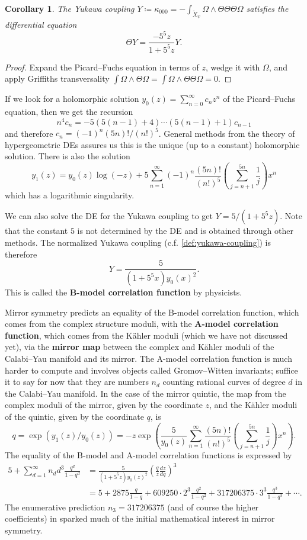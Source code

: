 \documentclass{report}
\theoremstyle{plain}
\newtheorem{corollary}[theorem]{Corollary}
\theoremstyle{definition}
\theoremstyle{remark}
\begin{document}
\begin{corollary}
  The Yukawa coupling $Y \coloneqq \kappa_{000} =
  -\int_{\tilde{X}_\psi} \Omega \wedge \Theta \Theta \Theta \Omega$
  satisfies the differential equation
  \[ \Theta Y = \frac{-5^5 z}{1 + 5^5z} Y. \]
\end{corollary}

\begin{proof}
  Expand the Picard--Fuchs equation in terms of $z$, wedge it with
  $\Omega$, and apply Griffiths transversality $\int \Omega \wedge
  \Theta \Omega = \int \Omega \wedge \Theta\Theta\Omega = 0$.
\end{proof}

If we look for a holomorphic solution $y_0(z) = \sum_{n=0}^\infty c_n
z^n$ of the Picard--Fuchs equation, then we get the recursion
\[ n^4 c_n = -5(5(n-1)+4) \cdots (5(n-1)+1) c_{n-1} \]
and therefore $c_n = (-1)^n(5n)!/(n!)^5$. General methods from the
theory of hypergeometric DEs assures us this is the unique (up to a
constant) holomorphic solution. There is also the solution
\[ y_1(z) = y_0(z) \log(-z) + 5 \sum_{n=1}^\infty (-1)^n\frac{(5n)!}{(n!)^5} \left(\sum_{j=n+1}^{5n} \frac{1}{j}\right) x^n \]
which has a logarithmic singularity.

We can also solve the DE for the Yukawa coupling to get $Y = 5/(1 +
5^5z)$. Note that the constant $5$ is not determined by the DE and is
obtained through other methods. The normalized Yukawa coupling (c.f.
\ref{def:yukawa-coupling}) is therefore
\[ Y = \frac{5}{(1 + 5^5x) y_0(x)^2}. \]
This is called the {\bf B-model correlation function} by physicists.

Mirror symmetry predicts an equality of the B-model correlation
function, which comes from the complex structure moduli, with the {\bf
  A-model correlation function}, which comes from the K\"ahler moduli
(which we have not discussed yet), via the {\bf mirror map} between
the complex and K\"ahler moduli of the Calabi--Yau manifold and its
mirror. The A-model correlation function is much harder to compute and
involves objects called Gromov--Witten invariants; suffice it to say
for now that they are numbers $n_d$ counting rational curves of degree
$d$ in the Calabi--Yau manifold. In the case of the mirror quintic,
the map from the complex moduli of the mirror, given by the coordinate
$z$, and the K\"ahler moduli of the quintic, given by the coordinate
$q$, is
\[ q = \exp(y_1(z)/y_0(z)) = -z \exp\left(\frac{5}{y_0(z)} \sum_{n=1}^\infty \frac{(5n)!}{(n!)^5} \left(\sum_{j=n+1}^{5n} \frac{1}{j}\right) x^n\right). \]
The equality of the B-model and A-model correlation functions is
expressed by
\begin{align*}
  5 + \sum_{d=1}^\infty n_d d^3 \frac{q^d}{1 - q^d}
  &= \frac{5}{(1 + 5^5z) y_0(z)^2} \left(\frac{q}{z} \frac{dz}{dq}\right)^3 \\
  &= 5 + 2875 \frac{q}{1-q} + 609250 \cdot 2^3 \frac{q^2}{1 - q^2} + 317206375 \cdot 3^3 \frac{q^3}{1 - q^3} + \cdots.
\end{align*}
The enumerative prediction $n_3 = 317206375$ (and of course the higher
coefficients) in \cite{Candelas1991a} sparked much of the initial
mathematical interest in mirror symmetry.
\end{document}
